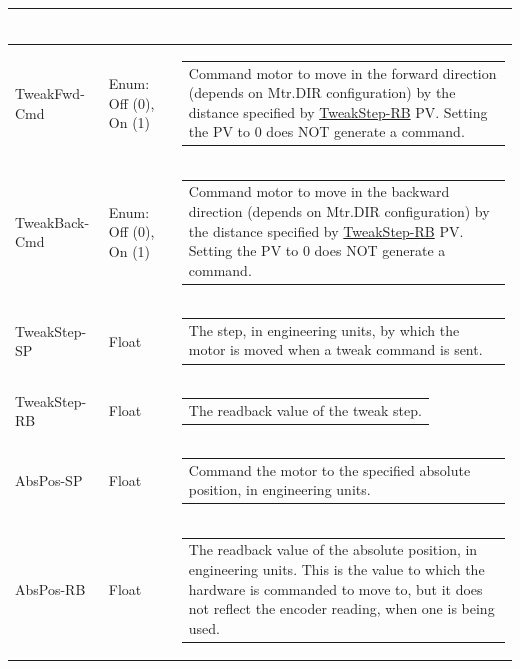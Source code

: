 \documentclass[openany]{article}
\begin{document}
\begin{longtable}{| m{4.5cm} m{2.5cm}  m{8.5cm} |}
\begin{tabular}{@{}m{6cm}@{}}
            \end{tabular} \hypertarget{pv:tweak-fwd-cmd}{}\\ \hline
        TweakFwd-Cmd & Enum: Off (0), On (1) & \begin{tabular}{@{}m{6cm}@{}}
                Command motor to move in the forward direction (depends on Mtr.DIR configuration) by the distance specified by \hyperlink{pv:tweak-step}{TweakStep-RB} PV. Setting the PV to 0 does NOT generate a command.
            \end{tabular} \hypertarget{pv:tweak-back-cmd}{}\\ \hline
        TweakBack-Cmd & Enum: Off (0), On (1) & \begin{tabular}{@{}m{6cm}@{}}
                Command motor to move in the backward direction (depends on Mtr.DIR configuration) by the distance specified by \hyperlink{pv:tweak-step}{TweakStep-RB} PV. Setting the PV to 0 does NOT generate a command.
            \end{tabular} \hypertarget{pv:tweak-step}{}\\ \hline
        TweakStep-SP & Float & \begin{tabular}{@{}m{6cm}@{}}
                The step, in engineering units, by which the motor is moved when a tweak command is sent.
            \end{tabular} \hypertarget{}{}\\ \hline
        TweakStep-RB & Float & \begin{tabular}{@{}m{6cm}@{}}
                The readback value of the tweak step.
            \end{tabular} \hypertarget{pv:abs-pos}{}\\ \hline
        AbsPos-SP & Float & \begin{tabular}{@{}m{6cm}@{}}
                Command the motor to the specified absolute position, in engineering units.
            \end{tabular} \hypertarget{}{}\\ \hline
        AbsPos-RB & Float & \begin{tabular}{@{}m{6cm}@{}}
                The readback value of the absolute position, in engineering units. This is the value to which the hardware is commanded to move to, but it does not reflect the encoder reading, when one is being used.
            \end{tabular} \hypertarget{pv:pos-diff-mon}{}\\ \hline

\end{longtable}
\end{document}
